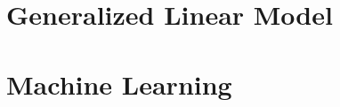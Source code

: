 \documentclass[pad,12pt,mtpro2]{elegantbook}
\begin{document}
\part{Generalized Linear Model}







\part{Machine Learning}






\appendix

\nocite{*}
\printbibliography
\end{document}

